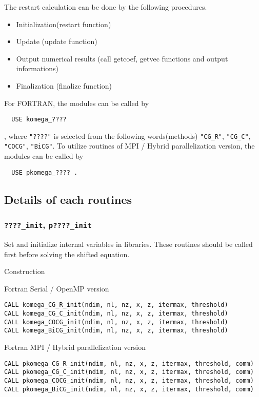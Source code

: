 \documentclass[12pt,titlepage]{article}
\begin{document}
The restart calculation can be done by the following procedures.
\begin{itemize}
\item Initialization(restart function)
\item Update (update function)
\item Output numerical results (call getcoef, getvec functions and output informations)
\item Finalization (finalize function)
\end{itemize}

For FORTRAN, the modules can be called by 
\begin{verbatim}
  USE komega_????
\end{verbatim}
, where \verb|"????"|  is selected from the following words(methods) \verb|"CG_R"|, \verb|"CG_C"|, \verb|"COCG"|, \verb|"BiCG"|.
To utilize routines of MPI / Hybrid parallelization version,
the modules can be called by
\begin{verbatim}
  USE pkomega_???? .
\end{verbatim}

\subsection{Details of each routines}

\subsubsection{\texttt{????\_init}, \texttt{p????\_init}}

Set and initialize internal variables in libraries.
These routines should be called first before solving the shifted equation.

\noindent Construction

\noindent Fortran Serial / OpenMP version
\begin{verbatim}
CALL komega_CG_R_init(ndim, nl, nz, x, z, itermax, threshold)
CALL komega_CG_C_init(ndim, nl, nz, x, z, itermax, threshold)
CALL komega_COCG_init(ndim, nl, nz, x, z, itermax, threshold)
CALL komega_BiCG_init(ndim, nl, nz, x, z, itermax, threshold)
\end{verbatim}

\noindent Fortran MPI / Hybrid parallelization version
\begin{verbatim}
CALL pkomega_CG_R_init(ndim, nl, nz, x, z, itermax, threshold, comm)
CALL pkomega_CG_C_init(ndim, nl, nz, x, z, itermax, threshold, comm)
CALL pkomega_COCG_init(ndim, nl, nz, x, z, itermax, threshold, comm)
CALL pkomega_BiCG_init(ndim, nl, nz, x, z, itermax, threshold, comm)
\end{verbatim}
\end{document}
